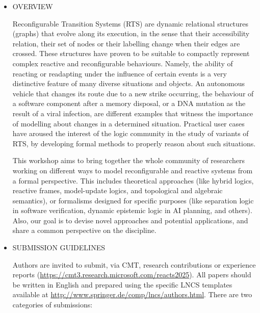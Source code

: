 \documentclass[prodmode,acmtecs]{acmsmall} %
\begin{document}
{\begin{itemize}\item  OVERVIEW 
 
  Reconfigurable Transition Systems (RTS) are dynamic relational structures (graphs) that evolve along its execution, in the sense that their accessibility relation, their set of nodes or their labelling change when their edges are crossed. These structures have proven to be suitable to compactly represent complex reactive and reconfigurable behaviours. Namely, the ability of reacting or readapting under the influence of certain events is a very distinctive feature of many diverse situations and objects. An autonomous vehicle that changes its route due to a new strike occurring, the behaviour of a software component after a memory disposal, or a DNA mutation as the result of a viral infection, are different examples that witness the importance of modelling about changes in a determined situation. Practical user cases have aroused the interest of the logic community in the study of variants of RTS, by developing formal methods to properly reason about such situations. 
 
  This workshop aims to bring together the whole community of researchers working on different ways to model reconfigurable and reactive systems from a formal perspective. This includes theoretical approaches (like hybrid logics, reactive frames, model-update logics, and topological and algebraic semantics), or formalisms designed for specific purposes (like separation logic in software verification, dynamic epistemic logic in AI planning, and others). Also, our goal is to devise novel approaches and potential applications, and share a common perspective on the discipline. 
 
\item  SUBMISSION GUIDELINES 
 
  Authors are invited to submit, via CMT, research contributions or experience reports (\href{https://cmt3.research.microsoft.com/reacts2025}{https://cmt3.research.microsoft.com/reacts2025}). All papers should be written in English and prepared using the specific LNCS templates available at \href{http://www.springer.de/comp/lncs/authors.html}{http://www.springer.de/comp/lncs/authors.html}. There are two categories of submissions: 
 

\end{itemize}}
\end{document}
